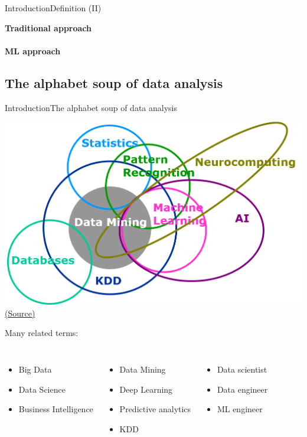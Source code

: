 \documentclass[10pt,compress]{beamer} %
\begin{document}
\begin{frame}{Introduction}{Definition (II)}
	\begin{center}
	\textbf{Traditional approach}\\
	\\
	\bigskip
	\textbf{ML approach}\\
	
	\end{center}	
\end{frame}

\subsection{The alphabet soup of data analysis}
\begin{frame}{Introduction}{The alphabet soup of data analysis}
	\begin{center}
	\includegraphics[width=0.5\linewidth]{figs/terms.png}\\
    \tiny{\href{https://www.quora.com/What-is-machine-learning-and-how-it-is-linked-to-Big-Data-Data-Mining}{(Source)}}
	\end{center}

	Many related terms:

    \begin{columns}
		\begin{itemize}
		\item Big Data
		\item Data Science
		\item Business Intelligence
		\end{itemize}
		\begin{itemize}
		\item Data Mining
		\item Deep Learning
		\item Predictive analytics
		\item KDD
		\end{itemize}
		\begin{itemize}
		\item Data scientist
		\item Data engineer
		\item ML engineer
		\end{itemize}
    \end{columns}
\end{frame}
\end{document}
